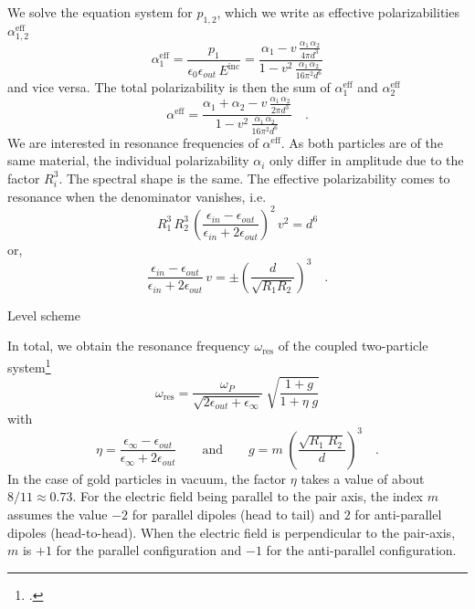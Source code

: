 We solve the equation system for $p_{1,2}$, which we write as effective polarizabilities $\alpha^\text{eff}_{1,2}$
\begin{equation}
 \alpha^\text{eff}_1 = \frac{p_1}{\epsilon_0 \epsilon_{out} \, E^\text{inc}} =  \frac{\alpha_1 - v \, \frac{\alpha_1 \, \alpha_2}{4 \pi d^3}}
 {1- v^2 \, \frac{\alpha_1 \, \alpha_2 }{16 \pi^2 d^6}} 
\end{equation}
and vice versa.
The total polarizability  is then the sum of $\alpha^\text{eff}_{1}$ and $\alpha^\text{eff}_{2}$
\begin{equation}
 \alpha^\text{eff} = \frac{\alpha_1  + \alpha_2 - v \, \frac{\alpha_1 \, \alpha_2}{2 \pi d^3}}
 {1- v^2 \, \frac{\alpha_1 \, \alpha_2 }{16 \pi^2 d^6}} \quad .
 \label{eq:5_hybrid_alpha_eff}
\end{equation}
We are interested in resonance frequencies of $\alpha^\text{eff} $. As both particles are of the same material, the individual polarizability $\alpha_i$ only differ in amplitude due to the factor $R_i^3$. The spectral shape is the same. The effective polarizability comes to resonance when the denominator vanishes, i.e.
\begin{equation}
R_1^3 \, R_2^3 \, \left( \frac{\epsilon_{in} - \epsilon_{out}} {\epsilon_{in} + 2 \epsilon_{out}} \right)^2 \, v^2 = d^6
\label{eq:5_hybrid_res_cond}
\end{equation}
or,
\begin{equation}
 \frac{\epsilon_{in} - \epsilon_{out}} {\epsilon_{in} + 2 \epsilon_{out}} \, v = \pm \left( \frac{d}{\sqrt{R_1 R_2}} \right)^3 \quad .
\end{equation}

\begin{marginfigure}
\caption{Level scheme}
\end{marginfigure}

In total, we obtain the resonance
frequency $\omega_{\text{res}} $ of the coupled two-particle system\footcite{Myroshnychenko08} 
%
\begin{equation}  \label{eq:5_hybrid_omega_coupled}
 \omega_{\text{res}} = \frac{\omega_P}{\sqrt{2 \epsilon_{out} + \epsilon_{\infty}} }  \; \sqrt{
\frac{1 + g}{ 1 +  \eta \; g}}
\end{equation}
%
with 
%
\begin{equation} \label{eq:5_hybrid_omega_coupled_variables}
 \eta = \frac{\epsilon_{\infty} - \epsilon_{out} }{\epsilon_{\infty} + 2 \epsilon_{out}  } 
 \qquad \text{and} \qquad
    g = m \;  \left( \frac{\sqrt{R_1 \; R_2 } } { d }  \right)^3 \quad .
\end{equation}
%
In the case of gold particles in vacuum, the factor $\eta$ takes a value of about $8/11 \approx 0.73$.
For the electric field being parallel to the pair axis, the index $m$ assumes
the value $-2$ for parallel dipoles (head to tail) and $2$ for anti-parallel
dipoles (head-to-head). When the electric field is perpendicular to the
pair-axis, $m$ is $+1$ for the parallel configuration and $-1$ for the
anti-parallel configuration.




